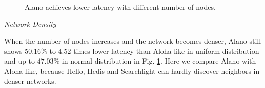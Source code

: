 \begin{figure}[!h]
\centering
{}
\hspace{0.01in}
\caption{Alano achieves lower latency with different number of nodes.}
\label{fig_node}
\end{figure}

\emph{Network Density} 

When the number of nodes increases and the network becomes denser, Alano still shows $50.16\%$ to $4.52$ times lower latency than Aloha-like in uniform distribution and up to $47.03\%$ in normal distribution in Fig. \ref{fig_node}. Here we compare Alano with Aloha-like, because Hello, Hedis and Searchlight can hardly discover neighbors in denser networks. 


